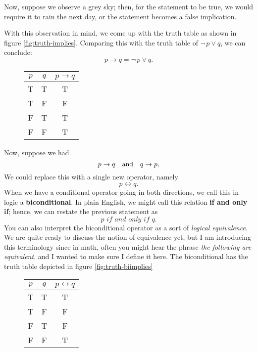 Now, suppose we observe a grey sky; then, for the statement to be true, we would require it to rain the next day, or the statement becomes a false implication.

With this observation in mind, we come up with the truth table as shown in figure \eqref{fig:truth-implies}.
Comparing this with the truth table of $\neg \,p \vee q$, we can conclude:
$$p \to q = \neg \,p \vee q.$$

\begin{figure}[h]
\centering
	\begin{tabular}{|c|c|c|}
		\hline
		$p$ & $q$ & $p\to q$ \\
		\hline
		T & T & T \\
		\hline
		T & F & F \\
		\hline
		F & T & T \\
		\hline
		F & F & T \\
		\hline
	\end{tabular}
	\caption{}
	\label{fig:truth-implies}
\end{figure}

Now, suppose we had
$$p \to q \quad\text{and}\quad q \to p,$$
We could replace this with a single new operator, namely
$$p \leftrightarrow q.$$
When we have a conditional operator going in both directions, we call this in logic a \textbf{biconditional}.
In plain English, we might call this relation \textbf{if and only if}; hence, we can restate the previous statement as
$$p \textit{ if and only if } q.$$
You can also interpret the biconditional operator as a sort of \textit{logical equivalence}.
We are quite ready to discuss the notion of equivalence yet, but I am introducing this terminology since in math, often you might hear the phrase \textit{the following are equivalent}, and I wanted to make sure I define it here.
The biconditional has the truth table depicted in figure \eqref{fig:truth-biimplies}

\begin{figure}[h]
\centering
	\begin{tabular}{|c|c|c|}
		\hline
		$p$ & $q$ & $p\leftrightarrow q$ \\
		\hline
		T & T & T \\
		\hline
		T & F & F \\
		\hline
		F & T & F \\
		\hline
		F & F & T \\
		\hline
	\end{tabular}
	\caption{}
	\label{fig:truth-biimplies}
\end{figure}

